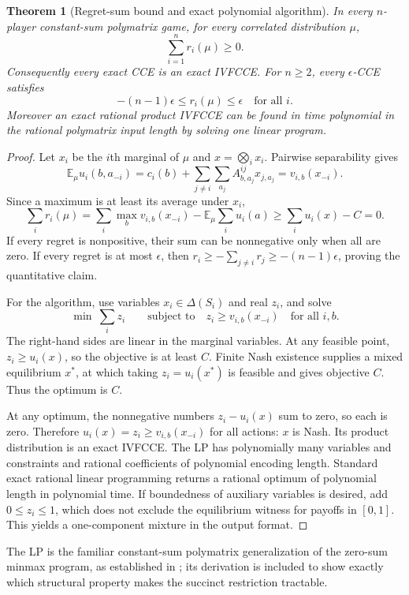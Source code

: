 \documentclass[11pt]{article}
\newtheorem{theorem}{Theorem}
\theoremstyle{definition}
\begin{document}
\begin{theorem}[Regret-sum bound and exact polynomial algorithm]
In every $n$-player constant-sum polymatrix game, for every correlated distribution $\mu$,
\[
 \sum_{i=1}^n r_i(\mu)\ge0.
\]
Consequently every exact CCE is an exact IVFCCE. For $n\ge2$, every $\epsilon$-CCE satisfies
\[
 -(n-1)\epsilon\le r_i(\mu)\le\epsilon\quad\text{for all }i.
\]
Moreover an exact rational product IVFCCE can be found in time polynomial in the rational polymatrix input length by solving one linear program.
\end{theorem}
\begin{proof}
Let $x_i$ be the $i$th marginal of $\mu$ and $x=\bigotimes_i x_i$. Pairwise separability gives
\[
 \mathbb E_\mu u_i(b,a_{-i})
 =c_i(b)+\sum_{j\ne i}\sum_{a_j}A^{ij}_{b,a_j}x_{j,a_j}
 =v_{i,b}(x_{-i}).
\]
Since a maximum is at least its average under $x_i$,
\[
 \sum_i r_i(\mu)
 =\sum_i\max_b v_{i,b}(x_{-i})-\mathbb E_\mu\sum_i u_i(a)
 \ge\sum_i u_i(x)-C=0.
\]
If every regret is nonpositive, their sum can be nonnegative only when all are zero. If every regret is at most $\epsilon$, then
$r_i\ge-\sum_{j\ne i}r_j\ge-(n-1)\epsilon$, proving the quantitative claim.

For the algorithm, use variables $x_i\in\Delta(S_i)$ and real $z_i$, and solve
\[
 \min\ \sum_i z_i\qquad
 \text{subject to}\quad z_i\ge v_{i,b}(x_{-i})\quad\text{for all }i,b.
\]
The right-hand sides are linear in the marginal variables. At any feasible point,
$z_i\ge u_i(x)$, so the objective is at least $C$. Finite Nash existence supplies a mixed equilibrium $x^*$, at which taking $z_i=u_i(x^*)$ is feasible and gives objective $C$. Thus the optimum is $C$.

At any optimum, the nonnegative numbers $z_i-u_i(x)$ sum to zero, so each is zero. Therefore $u_i(x)=z_i\ge v_{i,b}(x_{-i})$ for all actions: $x$ is Nash. Its product distribution is an exact IVFCCE. The LP has polynomially many variables and constraints and rational coefficients of polynomial encoding length. Standard exact rational linear programming returns a rational optimum of polynomial length in polynomial time. If boundedness of auxiliary variables is desired, add $0\le z_i\le1$, which does not exclude the equilibrium witness for payoffs in $[0,1]$. This yields a one-component mixture in the output format.
\end{proof}

The LP is the familiar constant-sum polymatrix generalization of the zero-sum minmax program, as established in \cite{polymatrix}; its derivation is included to show exactly which structural property makes the succinct restriction tractable.
\end{document}
